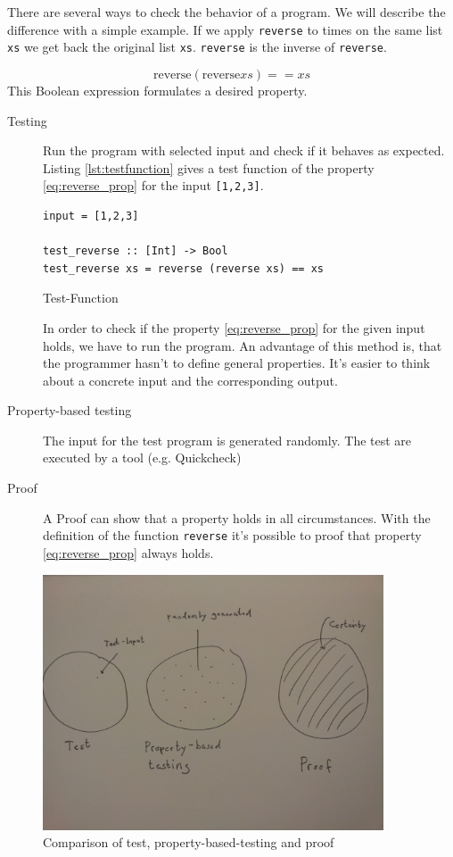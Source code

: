 \documentclass[twoside, a4paper]{article}
\begin{document}
There are several ways to check the behavior of a program. 
We will describe the difference with a simple example.
If we apply \verb|reverse| to times on the same list \verb|xs| we get back the original list \verb|xs|. \verb|reverse| is the inverse of \verb|reverse|. 

\begin{equation}
  \label{eq:reverse_prop}
\text{reverse} (\text{reverse} xs) == xs  
\end{equation}
This Boolean expression formulates a desired property. 

\begin{description}
\item[Testing] Run the program with selected input and check if it behaves as expected. Listing \ref{lst:testfunction} gives a test function of the property \ref{eq:reverse_prop} for the input \verb|[1,2,3]|.
  \label{fig:test}
\begin{program}
\begin{verbatim}
input = [1,2,3]

test_reverse :: [Int] -> Bool
test_reverse xs = reverse (reverse xs) == xs
\end{verbatim}
\caption{Test-Function}
\label{lst:testfunction}
\end{program}

In order to check if the property \ref{eq:reverse_prop} for the given input holds, we have to run the program.
 An advantage of this method is, that the programmer hasn't to define general properties. It's easier to think about a concrete input and the corresponding output.

\item[Property-based testing] The input for the test program is generated randomly. The test are executed by a tool (e.g. Quickcheck)
\item[Proof] A Proof can show that a property holds in all circumstances. With the definition of the function \verb|reverse| it's possible to proof that property \ref{eq:reverse_prop} always holds. 
\end{description}

\begin{figure}
  \centering
     \includegraphics[width=0.9\textwidth]{comp}
  \caption{Comparison of test, property-based-testing and proof}
  \label{fig:property_validation}
\end{figure}
\end{document}
